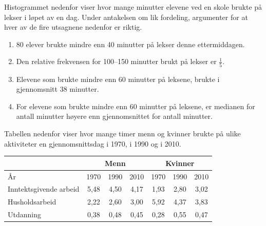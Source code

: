 \newpage
{}
Histogrammet nedenfor viser hvor mange minutter elevene ved en skole brukte på lekser i løpet av en dag.
Under antakelsen om lik fordeling, argumenter for at hver av de fire utsagnene nedenfor er riktig.
\begin{enumerate}
	\item
	80 elever brukte mindre enn 40 minutter på lekser denne ettermiddagen.
	\item
	Den relative frekvensen for 100–150 minutter brukt på lekser er $\frac{1}{5}$.
	\item
	Elevene som brukte mindre enn 60 minutter på leksene,
	brukte i gjennomsnitt 38 minutter.
	\item
	For elevene som brukte mindre enn 60 minutter på leksene, er medianen for antall
	minutter høyere enn gjennomsnittet for antall minutter.
\end{enumerate}

\newpage
{}
Tabellen nedenfor viser hvor mange timer menn og kvinner brukte på ulike aktiviteter
en gjennomsnittsdag i 1970, i 1990 og i 2010.
\begin{center}
	\small
	\begin{tabular}{|l|c|c|c|c|c|c|}
		\hline
		\rowcolor{Gray!20}  & \multicolumn{3}{c|}{Menn} & \multicolumn{3}{c|}{Kvinner} \\ \hline
		\rowcolor{Gray!20}  År & 1970 & 1990 & 2010 & 1970 & 1990 & 2010 \\ \hline
		Inntektsgivende arbeid & 5,48 & 4,50 & 4,17 & 1,93 & 2,80 & 3,02 \\ \hline
		Husholdsarbeid         & 2,22 & 2,60 & 3,00 & 5,92 & 4,37 & 3,83 \\ \hline
		Utdanning              & 0,38 & 0,48 & 0,45 & 0,28 & 0,55 & 0,47 \\ \hline
	\end{tabular}
\end{center}

